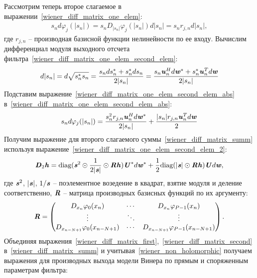 Рассмотрим теперь второе слагаемое в выражении~\eqref{wiener_diff_matrix_one_elem}:
\begin{align}
	s_nd\varphi_j(|s_n|)=s_nD_{|s_n|}\varphi_j(|s_n|)d|s_n|=s_nr_{j,n}d|s_n|,
	\label{wiener_diff_matrix_one_elem_second_elem}
\end{align}
где $r_{j,n}$ -- производная базисной функции нелинейности по ее входу. Вычислим дифференциал модуля выходного отсчета фильтра~\eqref{wiener_diff_matrix_one_elem_second_elem}:
\begin{equation}
	d|s_n|=d\sqrt{s_n^*s_n}=\frac{s_nds_n^*+s_n^*ds_n}{2|s_n|}=\frac{s_n\textbf{\textit{u}}_n^Hd\textbf{\textit{w}}^*+s_n^*\textbf{\textit{u}}_n^Td\textbf{\textit{w}}}{2|s_n|}
	\label{wiener_diff_matrix_one_elem_second_elem_abs}
\end{equation}
 Подставим выражение~\eqref{wiener_diff_matrix_one_elem_second_elem_abs} в~\eqref{wiener_diff_matrix_one_elem_second_elem_abs}:
 \begin{align}
 	s_nd\varphi_j(|s_n|)=\frac{s_n^2r_{j,n}\textbf{\textit{u}}_n^Hd\textbf{\textit{w}}^*}{2|s_n|}+\frac{|s_n|r_{j,n}\textbf{\textit{u}}_n^Td\textbf{\textit{w}}}{2}
 	\label{wiener_diff_matrix_one_elem_second_elem_2}
 \end{align}
Получим выражение для второго слагаемого суммы~\eqref{wiener_diff_matrix_summ} используя выражение~\eqref{wiener_diff_matrix_one_elem_second_elem_2}:
\begin{align}
	\textbf{\textit{D}}_2\textbf{\textit{h}}=\text{diag}(\textbf{\textit{s}}^2\odot\frac{1}{2|\textbf{\textit{s}}|}\odot\textbf{\textit{R}}\textbf{\textit{h}})\textbf{\textit{U}}^*d\textbf{\textit{w}}^*+\frac{1}{2}\text{diag}(|\textbf{\textit{s}}|\odot\textbf{\textit{R}}\textbf{\textit{h}})\textbf{\textit{U}}d\textbf{\textit{w}},
	\label{wiener_diff_matrix_second}
\end{align}
где $\textbf{\textit{s}}^2$, $|\textbf{\textit{s}}|$, $1/\textbf{\textit{s}}$ -- поэлементное возедение в квадрат, взятие модуля и деление соответственно, $\textbf{\textit{R}}$ -- матрица производных базисных функций по их аргументу:
\begin{equation}
	\textbf{\textit{R}}=\begin{pmatrix}
		D_{x_n}\varphi_{0}(x_n) & \cdots & D_{x_n}\varphi_{P-1}(x_n) \\
		\vdots & \ddots & \vdots \\
		D_{x_{n-N+1}}\varphi_{0}(x_{n-N+1}) & \cdots & D_{x_{n-N+1}}\varphi_{P-1}(x_{n-N+1})
	\end{pmatrix}.
	\label{deriv_basis_func_wrt_arg}
\end{equation}
Объединяя выражения~\eqref{wiener_diff_matrix_first},~\eqref{wiener_diff_matrix_second} в~\eqref{wiener_diff_matrix_summ} и учитывая~\eqref{wiener_non_holomorphic} получаем выражения для производных выхода модели Винера по прямым и споряженным параметрам фильтра:
